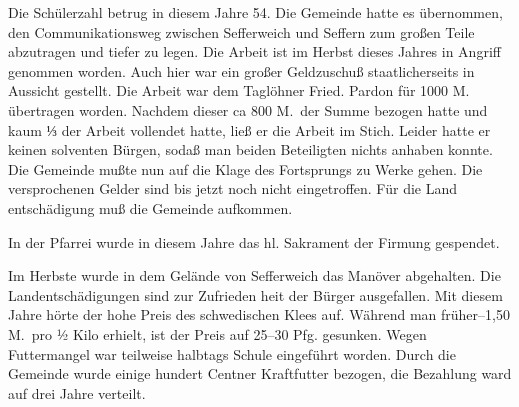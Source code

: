 

\pstart
Die Schülerzahl betrug in diesem Jahre 54.\ob
Die Gemeinde hatte es übernommen, den Communikationsweg\ob
zwischen Sefferweich und Seffern zum großen Teile\ob
abzutragen und tiefer zu legen. Die Arbeit ist im Herbst\ob
dieses Jahres in Angriff genommen worden. Auch hier war\ob
ein großer Geldzuschuß staatlicherseits in Aussicht gestellt.\ob
Die Arbeit war dem Taglöhner Fried. Pardon für 1000 M.\ob
übertragen worden. Nachdem dieser ca 800 M.\ der\ob
Summe bezogen hatte und kaum ⅓ der Arbeit vollendet\ob
hatte, ließ er die Arbeit im Stich. Leider hatte er\ob
keinen solventen Bürgen, sodaß man beiden Beteiligten\ob
nichts anhaben konnte. Die Gemeinde mußte nun auf\ob
die Klage des Fortsprungs zu Werke gehen. Die versprochenen\ob
Gelder sind bis jetzt noch nicht eingetroffen. Für die Land\ohb
entschädigung muß die Gemeinde aufkommen.

In der Pfarrei wurde in diesem Jahre das hl. Sakrament der\ob
Firmung gespendet.

Im Herbste wurde in dem Gelände von Sefferweich das\ob
Manöver abgehalten. Die Landentschädigungen sind zur Zufrieden\ohb
heit der Bürger ausgefallen. Mit diesem Jahre hörte der\ob
hohe Preis des schwedischen Klees auf. Während man früher--1,50 M.\ pro ½ Kilo erhielt, ist der Preis auf 25--30 Pfg.\ob
gesunken. Wegen Futtermangel war teilweise halbtags\ob
Schule eingeführt worden. Durch die Gemeinde wurde einige\ob
hundert Centner Kraftfutter bezogen, die Bezahlung ward\ob
auf drei Jahre verteilt.
\pend
